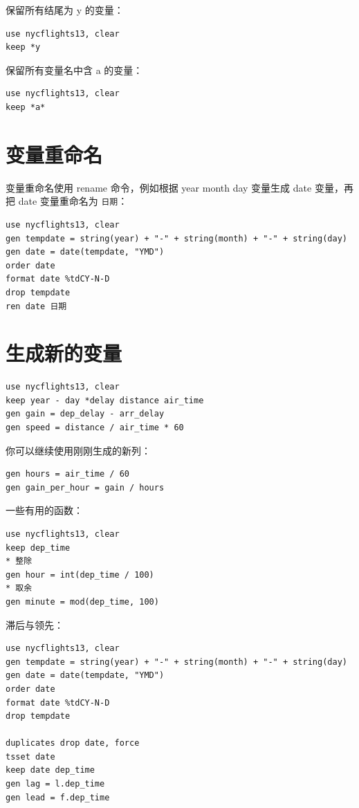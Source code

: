 保留所有结尾为 y 的变量：

\begin{lstlisting}
use nycflights13, clear
keep *y
\end{lstlisting}

保留所有变量名中含 a 的变量：

\begin{lstlisting}
use nycflights13, clear
keep *a*
\end{lstlisting}

\section{变量重命名}

变量重命名使用 rename 命令，例如根据 year month day 变量生成 date 变量，再把 date 变量重命名为 \texttt{日期}：

\begin{lstlisting}
use nycflights13, clear
gen tempdate = string(year) + "-" + string(month) + "-" + string(day)
gen date = date(tempdate, "YMD")
order date
format date %tdCY-N-D
drop tempdate
ren date 日期
\end{lstlisting}

\section{生成新的变量}

\begin{lstlisting}
use nycflights13, clear
keep year - day *delay distance air_time
gen gain = dep_delay - arr_delay
gen speed = distance / air_time * 60
\end{lstlisting}

你可以继续使用刚刚生成的新列：

\begin{lstlisting}
gen hours = air_time / 60
gen gain_per_hour = gain / hours
\end{lstlisting}

一些有用的函数：

\begin{lstlisting}
use nycflights13, clear
keep dep_time
* 整除
gen hour = int(dep_time / 100)
* 取余
gen minute = mod(dep_time, 100)
\end{lstlisting}

滞后与领先：

\begin{lstlisting}
use nycflights13, clear
gen tempdate = string(year) + "-" + string(month) + "-" + string(day)
gen date = date(tempdate, "YMD")
order date
format date %tdCY-N-D
drop tempdate

duplicates drop date, force
tsset date
keep date dep_time
gen lag = l.dep_time
gen lead = f.dep_time
\end{lstlisting}

